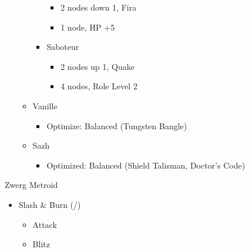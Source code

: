 \begin{menu}
\begin{itemize}
\begin{itemize}
\begin{itemize}
\begin{itemize}
						                  \item 2 nodes down 1, Fira
						                  \item 1 node, HP +5
					                  \end{itemize}
					            \item Saboteur
					                  \begin{itemize}
						                  \item 2 nodes up 1, Quake
						                  \item 4 nodes, Role Level 2
					                  \end{itemize}
				            \end{itemize}
			      \end{itemize}
			      \columnbreak
			      \equip
			      \begin{itemize}
				      \item Vanille
				            \begin{itemize}
					            \item \begin{flushleft}Optimize: Balanced (Tungsten Bangle)\end{flushleft}
				            \end{itemize}
				      \item Sazh
				            \begin{itemize}
					            \item \begin{flushleft}Optimized: Balanced (Shield Talisman, Doctor's Code)\end{flushleft}
				            \end{itemize}
			      \end{itemize}
		\end{itemize}
	\end{menu}
	\renewcommand{\first}{[1] Slash \& Burn (\com/\rav)}
	\renewcommand{\second}{[2] War \& Peace (\com/\med)}
	\renewcommand{\third}{[3] Tide Turner (\syn/\sab)}
	\renewcommand{\fourth}{[4] }
	\renewcommand{\fifth}{[5] Undermine (\rav/\sab)}
	\renewcommand{\sixth}{[6] Divide \& Conquer (\com/\sab)}

	\begin{battle}[0:06]{Zwerg Metroid}
		\begin{itemize}
			\item \first
			      \begin{itemize}
				      \item Attack
				      \item Blitz
			      \end{itemize}
		\end{itemize}
	\end{battle}

